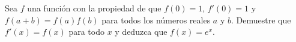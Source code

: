 \item Sea $f$ una función con la propiedad de que $f(0) = 1$, $f'(0) = 1$ y $f(a + b) = f(a)f(b)$ para todos los números reales $a$ y $b$. Demuestre que $f'(x) = f(x)$ para todo $x$ y deduzca que $f(x) = e^x$.

